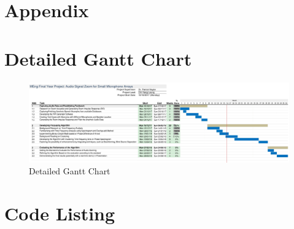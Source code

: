 \documentclass[a4paper,twoside,12pt,hidelinks]{article}
\begin{document}
\newpage
 

\newpage
\listoffigures
\listoftables
\newpage
\begin{appendices}
\begin{landscape}
\section*{Appendix}
\appendix
\section{Detailed Gantt Chart}
\renewcommand*{\thepage}{A-\arabic{page}}
\begin{figure}[H]
\begin{center}
\includegraphics[width=\linewidth,frame]{gantt}
\end{center}
\caption{Detailed Gantt Chart}
\end{figure}
\clearpage
\end{landscape}

\renewcommand*{\thepage}{B-\arabic{page}}
\section{Code Listing}
\label{appendixcode}

\newpage
{}%
\renewcommand*{\thepage}{C-\arabic{page}}

\end{appendices}
\end{document}

